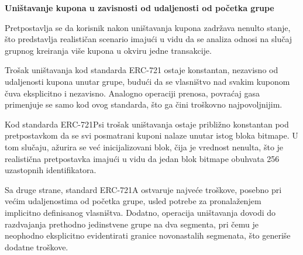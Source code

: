 \begin{description}
\item \textbf{Uništavanje kupona u zavisnosti od udaljenosti od početka grupe}

Pretpostavlja se da korisnik nakon uništavanja kupona zadržava nenulto stanje, što predstavlja realističan scenario imajući u vidu da se analiza odnosi na slučaj grupnog kreiranja više kupona u okviru jedne transakcije. 

Trošak uništavanja kod standarda ERC-721 ostaje konstantan, nezavisno od udaljenosti kupona unutar grupe, budući da se vlasništvo nad svakim kuponom čuva eksplicitno i nezavisno. Analogno operaciji prenosa, povraćaj gasa primenjuje se samo kod ovog standarda, što ga čini troškovno najpovoljnijim.

Kod standarda ERC-721Psi trošak uništavanja ostaje približno konstantan pod pretpostavkom da se svi posmatrani kuponi nalaze unutar istog bloka bitmape. U tom slučaju, ažurira se već inicijalizovani blok, čija je vrednost nenulta, što je realistična pretpostavka imajući u vidu da jedan blok bitmape obuhvata 256 uzastopnih identifikatora.

Sa druge strane, standard ERC-721A ostvaruje najveće troškove, posebno pri većim udaljenostima od početka grupe, usled potrebe za pronalaženjem implicitno definisanog vlasništva. Dodatno, operacija uništavanja dovodi do razdvajanja prethodno jedinstvene grupe na dva segmenta, pri čemu je neophodno eksplicitno evidentirati granice novonastalih segmenata, što generiše dodatne troškove.

\begin{rezultati}[H]
\centering

\begin{minipage}{0.48\textwidth}
\centering


\end{minipage}
\end{rezultati}
\end{description}
